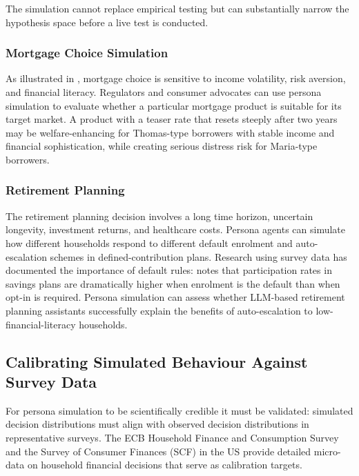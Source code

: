 \begin{context}
The simulation cannot replace empirical testing but can substantially narrow the hypothesis space before a live test is conducted.

\subsubsection*{Mortgage Choice Simulation}

As illustrated in , mortgage choice is sensitive to income volatility, risk aversion, and financial literacy. Regulators and consumer advocates can use persona simulation to evaluate whether a particular mortgage product is suitable for its target market. A product with a teaser rate that resets steeply after two years may be welfare-enhancing for Thomas-type borrowers with stable income and financial sophistication, while creating serious distress risk for Maria-type borrowers.

\subsubsection*{Retirement Planning}

The retirement planning decision involves a long time horizon, uncertain longevity, investment returns, and healthcare costs. Persona agents can simulate how different households respond to different default enrolment and auto-escalation schemes in defined-contribution plans. Research using survey data has documented the importance of default rules: \citet{campbell2006household} notes that participation rates in savings plans are dramatically higher when enrolment is the default than when opt-in is required. Persona simulation can assess whether LLM-based retirement planning assistants successfully explain the benefits of auto-escalation to low-financial-literacy households.

\subsection{Calibrating Simulated Behaviour Against Survey Data}
\label{subsec:persona-calibration}

For persona simulation to be scientifically credible it must be validated: simulated decision distributions must align with observed decision distributions in representative surveys. The ECB Household Finance and Consumption Survey \cite{ecb2020hfcs} and the Survey of Consumer Finances (SCF) in the US provide detailed micro-data on household financial decisions that serve as calibration targets.


\end{context}
